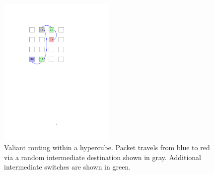 \begin{figure}[h!]
\centering
\includegraphics[width=0.5\textwidth]{figures/tikz/hypercube/hypercube_valiant.pdf}
\caption{Valiant routing within a hypercube.  Packet travels from blue to red via a random intermediate destination shown in gray. Additional intermediate switches are shown in green.}
\label{fig:topologies:hypercubeValiant}
\end{figure}
